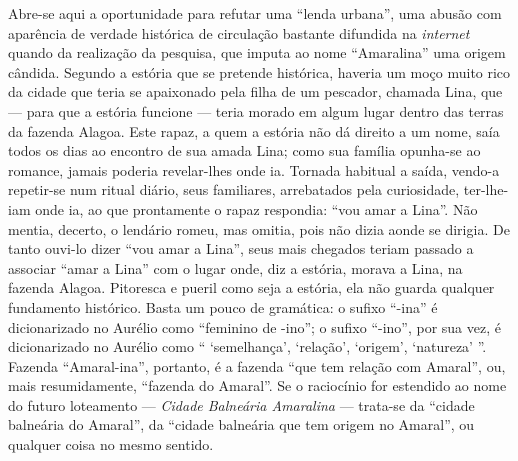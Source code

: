 Abre-se aqui a oportunidade para refutar uma ``lenda urbana'', uma abusão com aparência de verdade histórica de circulação bastante difundida na \textit{internet} quando da realização da pesquisa, que imputa ao nome ``Amaralina'' uma origem cândida. Segundo a estória que se pretende histórica, haveria um moço muito rico da cidade que teria se apaixonado pela filha de um pescador, chamada Lina, que --- para que a estória funcione --- teria morado em algum lugar dentro das terras da fazenda Alagoa. Este rapaz, a quem a estória não dá direito a um nome, saía todos os dias ao encontro de sua amada Lina; como sua família opunha-se ao romance, jamais poderia revelar-lhes onde ia. Tornada habitual a saída, vendo-a repetir-se num ritual diário, seus familiares, arrebatados pela curiosidade, ter-lhe-iam onde ia, ao que prontamente o rapaz respondia: ``vou amar a Lina''. Não mentia, decerto, o lendário romeu, mas omitia, pois não dizia aonde se dirigia. De tanto ouvi-lo dizer ``vou amar a Lina'', seus mais chegados teriam passado a associar ``amar a Lina'' com o lugar onde, diz a estória, morava a Lina, na fazenda Alagoa. Pitoresca e pueril como seja a estória, ela não guarda qualquer fundamento histórico. Basta um pouco de gramática: o sufixo ``-ina'' é dicionarizado no Aurélio como ``feminino de -ino''; o sufixo ``-ino'', por sua vez, é dicionarizado no Aurélio como `` `semelhança', `relação', `origem', `natureza' ''. Fazenda ``Amaral-ina'', portanto, é a fazenda ``que tem relação com Amaral'', ou, mais resumidamente, ``fazenda do Amaral''. Se o raciocínio for estendido ao nome do futuro loteamento --- \textit{Cidade Balneária Amaralina} --- trata-se da ``cidade balneária do Amaral'', da ``cidade balneária que tem origem no Amaral'', ou qualquer coisa no mesmo sentido.

